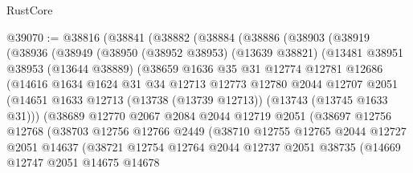 \begin{lexlean}{RustCore}
\begin{coremodule}
@39070 := @38816
    (@38841
      (@38882
        (@38884
          (@38886
            (@38903
              (@38919
                (@38936
                  (@38949
                    (@38950
                      (@38952 @38953)
                      (@13639 @38821)
                      (@13481
                        @38951
                        @38953
                        (@13644 @38889)
                        (@38659
                          @1636
                          @35
                          @31
                          @12774
                          @12781
                          @12686
                          (@14616
                            @1634
                            @1624
                            @31
                            @34
                            @12713
                            @12773
                            @12780
                            @2044
                            @12707
                            @2051
                            (@14651
                              @1633
                              @12713
                              (@13738 (@13739 @12713))
                              (@13743 (@13745 @1633 @31)))
                            (@38689
                              @12770
                              @2067
                              @2084
                              @2044
                              @12719
                              @2051
                              (@38697
                                @12756
                                @12768
                                (@38703
                                  @12756
                                  @12766
                                  @2449
                                  (@38710
                                    @12755
                                    @12765
                                    @2044
                                    @12727
                                    @2051
                                    @14637
                                    (@38721
                                      @12754
                                      @12764
                                      @2044
                                      @12737
                                      @2051
                                      @38735
                                      (@14669
                                        @12747
                                        @2051
                                        @14675
                                        @14678

\end{coremodule}
\end{lexlean}
